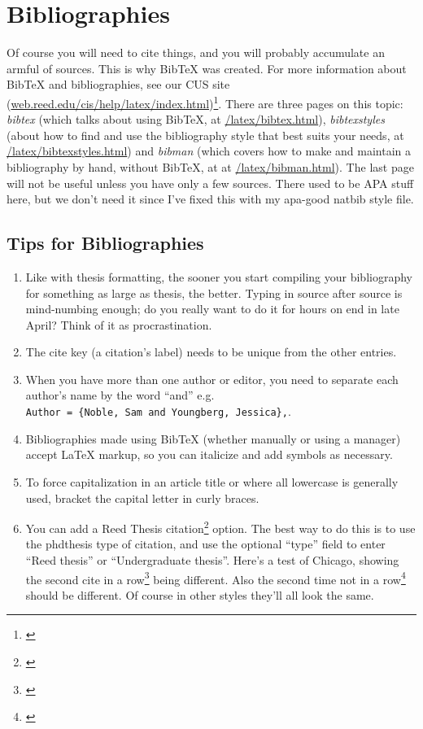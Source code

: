 \documentclass[12pt,twoside]{reedthesis}
\begin{document}
\section{Bibliographies}
	Of course you will need to cite things, and you will probably accumulate an armful of sources. This is why BibTeX was created. For more information about BibTeX and bibliographies, see our CUS site (\url{web.reed.edu/cis/help/latex/index.html})\footnote{\cite{reedweb:2007}}. There are three pages on this topic: {\it bibtex} (which talks about using BibTeX, at \url{/latex/bibtex.html}), {\it bibtexstyles} (about how to find and use the bibliography style that best suits your needs, at \url{/latex/bibtexstyles.html}) and {\it bibman} (which covers how to make and maintain a bibliography by hand, without BibTeX, at at \url{/latex/bibman.html}). The last page will not be useful unless you have only a few sources. There used to be APA stuff here, but we don't need it since I've fixed this with my apa-good natbib style file.
	
\subsection{Tips for Bibliographies}
\begin{enumerate}
\item Like with thesis formatting, the sooner you start compiling your bibliography for something as large as thesis, the better. Typing in source after source is mind-numbing enough; do you really want to do it for hours on end in late April? Think of it as procrastination.
\item The cite key (a citation's label) needs to be unique from the other entries.
\item When you have more than one author or editor, you need to separate each author's name by the word ``and'' e.g.\\ \verb+Author = {Noble, Sam and Youngberg, Jessica},+.
\item Bibliographies made using BibTeX (whether manually or using a manager) accept LaTeX markup, so you can italicize and add symbols as necessary.
\item To force capitalization in an article title or where all lowercase is generally used, bracket the capital letter in curly braces.
\item You can add a Reed Thesis citation\footnote{\cite{noble:2002}} option. The best way to do this is to use the phdthesis type of citation, and use the optional ``type'' field to enter ``Reed thesis'' or ``Undergraduate thesis''. Here's a test of Chicago, showing the second cite in a row\footnote{\cite{noble:2002}} being different. Also the second time not in a row\footnote{\cite{reedweb:2007}} should be different. Of course in other styles they'll all look the same.
\end{enumerate}
\end{document}
